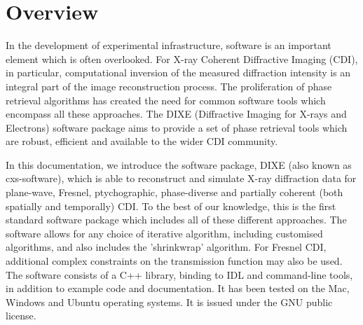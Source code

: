 \documentclass[]{cxs-software}
\begin{document}




\section{Overview}

In the development of experimental infrastructure, software is an
important element which is often overlooked. For X-ray Coherent
Diffractive Imaging (CDI), in particular, computational inversion of
the measured diffraction intensity is an integral part of the image
reconstruction process. The proliferation of phase retrieval
algorithms has created the need for common software tools which
encompass all these approaches. The DIXE (Diffractive Imaging for
X-rays and Electrons) software package aims to provide a set of phase
retrieval tools which are robust, efficient and available to the wider
CDI community.

In this documentation, we introduce the software package, DIXE (also
known as cxs-software), which is able to reconstruct and simulate
X-ray diffraction data for plane-wave, Fresnel, ptychographic,
phase-diverse and partially coherent (both spatially and temporally) 
CDI. To the best of our knowledge, this is the first
standard software package which includes all of these different
approaches. The software allows for any choice of iterative algorithm,
including customised algorithms, and also includes the 'shrinkwrap'
algorithm. For Fresnel CDI, additional complex constraints on the
transmission function may also be used. The software consists of a C++
library, binding to IDL and command-line tools, in addition to example
code and documentation. It has been tested on the Mac, Windows and
Ubuntu operating systems. It is issued under the GNU public license.
\end{document}
